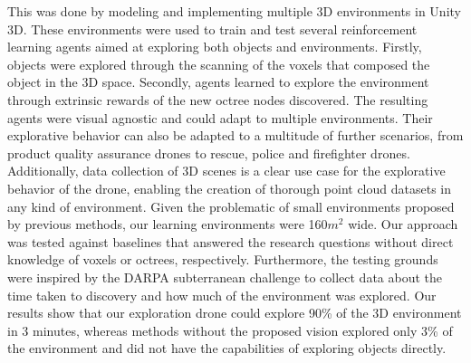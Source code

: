 

This was done by modeling and implementing multiple 3D environments in Unity 3D.
These environments were used to train and test several reinforcement learning agents aimed at exploring both objects and environments.
Firstly, objects were explored through the scanning of the voxels that composed the object in the 3D space. 
Secondly, agents learned to explore the environment through extrinsic rewards of the new octree nodes discovered. The resulting agents were visual agnostic and could adapt to multiple environments. Their explorative behavior can also be adapted to a multitude of further scenarios, from product quality assurance drones to rescue, police and firefighter drones. 
Additionally, data collection of 3D scenes is a clear use case for the explorative behavior of the drone, enabling the creation of thorough point cloud datasets in any kind of environment. Given the problematic of small environments proposed by previous methods, our learning environments were 160$m^2$ wide. Our approach was tested against baselines that answered the research questions without direct knowledge of voxels or octrees, respectively. Furthermore, the testing grounds were inspired by the DARPA subterranean challenge to collect data about the time taken to discovery and how much of the environment was explored. Our results show that our exploration drone could explore 90\% of the 3D environment in 3 minutes, whereas methods without the proposed vision explored only 3\% of the environment and did not have the capabilities of exploring objects directly. 

